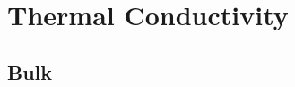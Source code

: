 \documentclass[aps,prb,twocolumn,superscriptaddress,footinbib,amsmath,amssymb,floatfix]{revtex4}
\begin{document}


\section{\label{S:Conductivity}Thermal Conductivity}

\subsection{\label{S:Bulk}Bulk}
\end{document}
